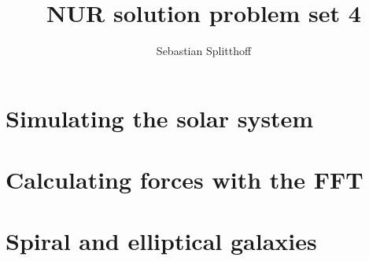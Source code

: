 \documentclass[a4paper,10pt]{article}
\title{NUR solution problem set 4}
\author{Sebastian Splitthoff}
\begin{document}
\maketitle

\section{Simulating the solar system}





\section{Calculating forces with the FFT}





\section{Spiral and elliptical galaxies}




\end{document}
